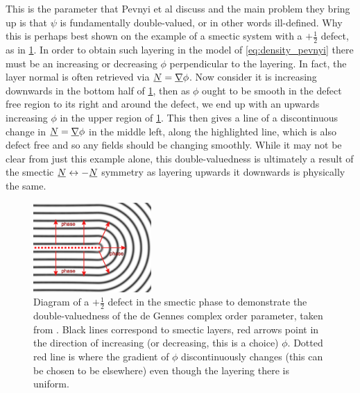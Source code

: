 \documentclass[12pt]{article}
\newcommand{\suf}[2]{\stackunder[1pt]{\ensuremath{#1}}{\rule{\widthof{\ensuremath{#2}}*\real{0.9}}{.1ex}}}
\newcommand{\su}[1]{\suf{#1}{#1}}
\newcommand{\mgrad}{\suf{\nabla}{K}}
\begin{document}
This is the parameter that Pevnyi et al discuss and the main problem they bring up is that $\psi$ is fundamentally double-valued, or in other words ill-defined.
Why this is perhaps best shown on the example of a smectic system with a $+\frac{1}{2}$ defect, as in \cref{fig:pevnyi}.
In order to obtain such layering in the model of \cref{eq:density_pevnyi} there must be an increasing or decreasing $\phi$ perpendicular to the layering.
In fact, the layer normal is often retrieved via $\su{N} = \mgrad \phi$.
Now consider it is increasing downwards in the bottom half of \cref{fig:pevnyi}, then as $\phi$ ought to be smooth in the defect free region to its right and around the defect, we end up with an upwards increasing $\phi$ in the upper region of \cref{fig:pevnyi}.
This then gives a line of a discontinuous change in $\su{N} = \mgrad \phi$ in the middle left, along the highlighted line, which is also defect free and so any fields should be changing smoothly.
While it may not be clear from just this example alone, this double-valuedness is ultimately a result of the smectic $\su{N} \leftrightarrow -\su{N}$ symmetry as layering upwards it downwards is physically the same.
\begin{figure}[t]
    \begin{center}
        \includegraphics[width=0.4\textwidth]{figures/pevnyi.pdf}
    \end{center}
    \caption{
        Diagram of a $+\frac{1}{2}$ defect in the smectic phase to demonstrate the double-valuedness of the de Gennes complex order parameter, taken from \cite{pevnyiModelingSmecticLayers2014}.
        Black lines correspond to smectic layers, red arrows point in the direction of increasing (or decreasing, this is a choice) $\phi$.
        Dotted red line is where the gradient of $\phi$ discontinuously changes (this can be chosen to be elsewhere) even though the layering there is uniform.
    }\label{fig:pevnyi}
\end{figure}
\end{document}
